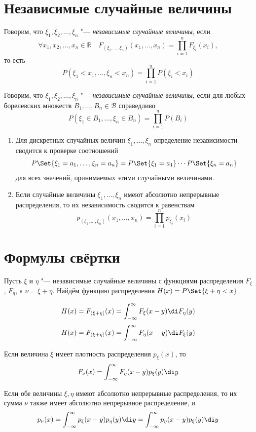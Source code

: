 \section{Независимые случайные величины}

\begin{definition}
	Говорим, что $ \xi_1, \xi_2, \dots, \xi_n $ "--- \emph{независимые случайные величины}, если
	$$ \forall x_1, x_2, \dots, x_n \in \mathbb R \quad F_{(\xi_1, \dots, \xi_n)}(x_1, \dots, x_n) =
	\prod_{i = 1}^n F_{\xi_i}(x_i), $$
	то есть
	$$ P(\xi_1 < x_1, \dots, \xi_n < x_n) = \prod_{i = 1}^n P(\xi_i < x_i) $$
\end{definition}

\begin{definition}
	Говорим, что $ \xi_1, \xi_2, \dots, \xi_n $ "--- \emph{независимые случайные величины}, если для
	любых борелевских множеств $ B_1, \dots, B_n \in \mathcal B $ справедливо
	$$ P(\xi_1 \in B_1, \dots, \xi_n \in B_n) = \prod_{i = 1}^n P(B_i) $$
\end{definition}

\begin{enumerate}
	\item Для дискретных случайных величин $ \xi_1, \dots, \xi_n $ определение независимости
		сводится к проверке соотношений
		$$ P\Set{\xi_1 = a_1, \dots, \xi_n = a_n} = P\Set{\xi_1 = a_1} \cdots P\Set{\xi_n = a_n} $$
		для всех значений, принимаемых этими случайными величинами.
	\item Если случайные величины $ \xi_1, \dots, \xi_n $ имеют абсолютно непрерывные распределения,
		то их независимость сводится к равенствам
		$$ p_{(\xi_1, \dots, \xi_n)}(x_1, \dots, x_n) = \prod_{i = 1}^n p_{\xi_i}(x_i) $$
\end{enumerate}

\section{Формулы свёртки}

Пусть $ \xi $ и $ \eta $ "--- независимые случайные величины с функциями распределения $ F_\xi $,
$ F_\eta $, а $ \nu = \xi + \eta $.
Найдём функцию распределения $ H(x) = P\Set{\xi + \eta < x} $.

$$ H(x) = F_{(\xi + \eta)}(x) = \int_{-\infty}^\infty F_\xi(x - y) \di F_\eta(y) $$
$$ H(x) = F_{(\xi + \eta)}(x) = \int_{-\infty}^\infty F_\eta(x - y) \di F_\xi(y) $$

\begin{statement}
	Если величина $ \xi $ имеет плотность распределения $ p_\xi(x) $, то
	$$ F_\nu(x) = \int_{-\infty}^\infty F_\eta(x - y) p_\xi(y) \di y $$
\end{statement}

\begin{statement}
	Если обе величины $ \xi, \eta $ имеют абсолютно непрерывные распределения, то их сумма $ \nu $
	также имеет абсолютно непрерывное распределение, и
	$$ p_\nu(x) = \int_{-\infty}^\infty p_\xi(x - y) p_\eta(y) \di y =
	\int_{-\infty}^\infty p_\eta(x - y) p_\xi(y) \di y $$
\end{statement}

